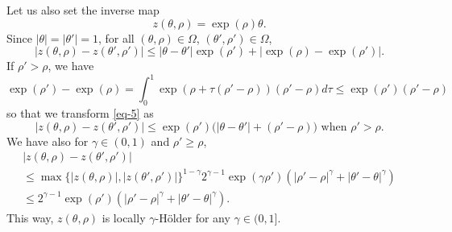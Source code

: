 \documentclass[a4paper,12pt]{article}
\theoremstyle{definition}
\begin{document}
Let us also set the inverse map
\begin{equation*}
z(\theta,\rho)=\exp(\rho)\theta.
\end{equation*}
Since $|\theta|=|\theta'|=1$, for all $(\theta,\rho)\in\Omega$, $(\theta',\rho')\in\Omega$,
\begin{equation}
\label{eq-5}
|z(\theta,\rho)-z(\theta',\rho')|\leq 
|\theta-\theta'|\exp(\rho')+|\exp(\rho)-\exp(\rho')|.
\end{equation}
If $\rho'>\rho$, we have
\begin{equation*}
\exp(\rho')-\exp(\rho)=\int_0^1 \exp(\rho+\tau(\rho'-\rho))(\rho'-\rho)d\tau
\leq \exp(\rho')(\rho'-\rho)
\end{equation*}
so that we transform \eqref{eq-5} as 
\begin{equation}
\label{eq-6}
|z(\theta,\rho)-z(\theta',\rho')|\leq 
\exp(\rho')\big(|\theta-\theta'|+(\rho'-\rho)\big)\text{ when }
\rho'>\rho.
\end{equation}
We have also for $\gamma\in(0,1)$ and $\rho'\geq \rho$,  
\begin{multline}
\label{eq-7}
|z(\theta,\rho)-z(\theta',\rho')|\\
\leq 
\max\{|z(\theta,\rho)|,|z(\theta',\rho')|\}^{1-\gamma}
2^{\gamma-1}\exp(\gamma\rho')(
|\rho'-\rho|^\gamma+|\theta'-\theta|^\gamma)\\
\leq 2^{\gamma-1}\exp(\rho')(|\rho'-\rho|^\gamma+|\theta'-\theta|^\gamma).
\end{multline}
This way, $z(\theta,\rho)$ is locally $\gamma$-Hölder
for any $\gamma\in(0,1]$.
\end{document}

